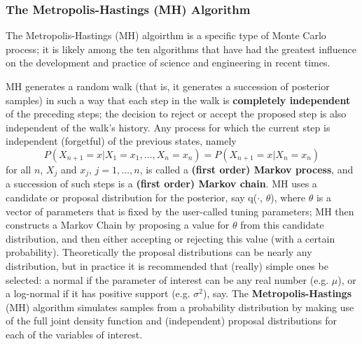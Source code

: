 \subsubsection*{The Metropolis-Hastings (MH) Algorithm}
The Metropolis-Hastings (MH) algoirthm is a specific type of Monte Carlo process; it is likely among the ten algorithms that have had the greatest influence on the development and practice of science and engineering in recent times. \par MH generates a random walk (that is, it generates a succession of posterior samples) in such a way that each step in the walk is \textbf{completely independent} of the preceding steps; the decision to reject or accept the proposed step is also independent of the walk's history. \newl Any process for which the current step is independent (forgetful) of the previous states, namely
$$P(X_{n+1}=x|X_1=x_1,\ldots,X_n=x_n)=P(X_{n+1}=x|X_n=x_n)$$ for all $n$, $X_j$ and $x_j$, $j=1,\ldots, n$, is called a \textbf{(first order) Markov process}, and a succession of such steps is a \textbf{(first order) Markov chain}.  \newl MH uses a candidate or proposal distribution for the posterior, say q($\cdot$, $\theta$), where $\theta$ is a vector of parameters that is fixed by the user-called tuning parameters; MH then constructs a Markov Chain by proposing a value for $\theta$ from this candidate distribution, and then either accepting or rejecting this value (with a certain probability). \newpage\noindent Theoretically the proposal distributions can be nearly any distribution, but in practice it is recommended that (really) simple ones be selected: a normal if the parameter of interest can be any real number (e.g. $\mu$), or a log-normal if it has positive support (e.g. $\sigma^{2}$), say. \newl
The \textbf{Metropolis-Hastings} (MH) algorithm simulates samples from a probability distribution by making use of the full joint density function and (independent) proposal distributions for each of the variables of interest. 

